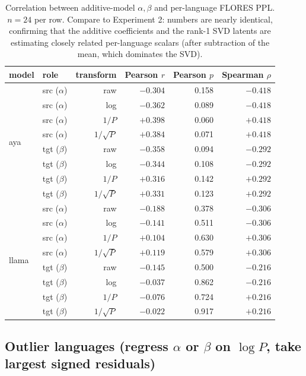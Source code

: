 \documentclass[11pt]{article}
\begin{document}
\begin{table}[h]
\centering
\small
\begin{tabular}{llrrrr}
\toprule
model & role & transform & Pearson $r$ & Pearson $p$ & Spearman $\rho$ \\
\midrule
\multirow{8}{*}{aya}
 & src ($\alpha$) & raw       & $-0.304$ & 0.158 & $-0.418$ \\
 & src ($\alpha$) & log       & $-0.362$ & 0.089 & $-0.418$ \\
 & src ($\alpha$) & $1/P$     & $+0.398$ & 0.060 & $+0.418$ \\
 & src ($\alpha$) & $1/\sqrt{P}$ & $+0.384$ & 0.071 & $+0.418$ \\
 & tgt ($\beta$)  & raw       & $-0.358$ & 0.094 & $-0.292$ \\
 & tgt ($\beta$)  & log       & $-0.344$ & 0.108 & $-0.292$ \\
 & tgt ($\beta$)  & $1/P$     & $+0.316$ & 0.142 & $+0.292$ \\
 & tgt ($\beta$)  & $1/\sqrt{P}$ & $+0.331$ & 0.123 & $+0.292$ \\
\midrule
\multirow{8}{*}{llama}
 & src ($\alpha$) & raw       & $-0.188$ & 0.378 & $-0.306$ \\
 & src ($\alpha$) & log       & $-0.141$ & 0.511 & $-0.306$ \\
 & src ($\alpha$) & $1/P$     & $+0.104$ & 0.630 & $+0.306$ \\
 & src ($\alpha$) & $1/\sqrt{P}$ & $+0.119$ & 0.579 & $+0.306$ \\
 & tgt ($\beta$)  & raw       & $-0.145$ & 0.500 & $-0.216$ \\
 & tgt ($\beta$)  & log       & $-0.037$ & 0.862 & $-0.216$ \\
 & tgt ($\beta$)  & $1/P$     & $-0.076$ & 0.724 & $+0.216$ \\
 & tgt ($\beta$)  & $1/\sqrt{P}$ & $-0.022$ & 0.917 & $+0.216$ \\
\bottomrule
\end{tabular}
\caption{Correlation between additive-model $\alpha, \beta$ and per-language
FLORES PPL. $n = 24$ per row. Compare to Experiment 2: numbers are nearly
identical, confirming that the additive coefficients and the rank-1 SVD
latents are estimating closely related per-language scalars (after
subtraction of the mean, which dominates the SVD).}
\end{table}

\subsection{Outlier languages (regress $\alpha$ or $\beta$ on $\log P$,
take largest signed residuals)}
\end{document}
